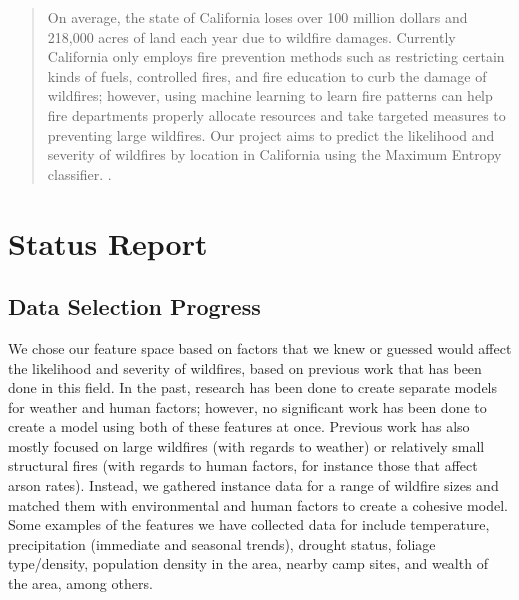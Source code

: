 \documentclass{article}
\begin{document}
 


\begin{abstract}
	On average, the state of California loses over 100 million dollars and 218,000 acres of land each year due to wildfire damages. Currently California only employs fire prevention methods such as restricting certain kinds of fuels, controlled fires, and fire education to curb the damage of wildfires; however, using machine learning to learn fire patterns can help fire departments properly allocate resources and take targeted measures to preventing large wildfires.  Our project aims to predict the likelihood and severity of wildfires by location in California using the Maximum Entropy classifier. .
\end{abstract} 
\section{Status Report}
\subsection{Data Selection Progress} 
	We chose our feature space based on factors that we knew or guessed would affect the likelihood and severity of wildfires, based on previous work that has been done in this field.  In the past, research has been done to create separate models for weather and human factors; however, no significant work has been done to create a model using both of these features at once.  Previous work has also mostly focused on large wildfires (with regards to weather) or relatively small structural fires (with regards to human factors, for instance those that affect arson rates).  Instead, we gathered instance data for a range of wildfire sizes and matched them with environmental and human factors to create a cohesive model.  Some examples of the features we have collected data for include temperature, precipitation (immediate and seasonal trends), drought status, foliage type/density, population density in the area, nearby camp sites, and wealth of the area, among others. 
\end{document}
